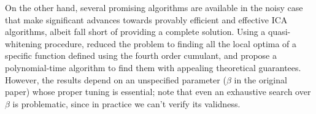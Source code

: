 \documentclass[jmlr]{article}
\theoremstyle{definition}
\begin{document}
On the other hand, several promising algorithms are available in the noisy case that make significant advances towards provably efficient and effective ICA algorithms, albeit fall short of providing a complete solution. 
Using a quasi-whitening procedure, \citet{arora2012provable} reduced the problem to finding all the local optima of a specific function defined using the fourth order cumulant, 
and propose a polynomial-time algorithm to find them with appealing theoretical guarantees. However, the results depend on an unspecified parameter ($\beta$ in the original paper) whose proper tuning is essential; 
note that even an exhaustive search over $\beta$ is problematic, since in practice we can't verify its validness.

\end{document}
